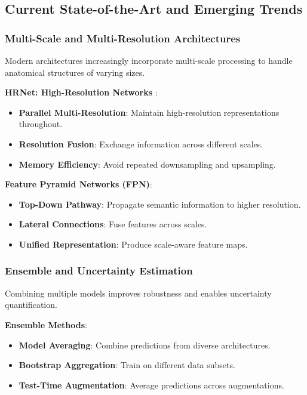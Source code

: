 \documentclass[12pt,a4paper]{article}
\begin{document}
\subsection{Current State-of-the-Art and Emerging Trends}

\subsubsection{Multi-Scale and Multi-Resolution Architectures}

Modern architectures increasingly incorporate multi-scale processing to handle anatomical structures of varying sizes.

\textbf{HRNet: High-Resolution Networks} \cite{wang2020deep}:
\begin{itemize}
    \item \textbf{Parallel Multi-Resolution}: Maintain high-resolution representations throughout.
    \item \textbf{Resolution Fusion}: Exchange information across different scales.
    \item \textbf{Memory Efficiency}: Avoid repeated downsampling and upsampling.
\end{itemize}

\textbf{Feature Pyramid Networks (FPN)}:
\begin{itemize}
    \item \textbf{Top-Down Pathway}: Propagate semantic information to higher resolution.
    \item \textbf{Lateral Connections}: Fuse features across scales.
    \item \textbf{Unified Representation}: Produce scale-aware feature maps.
\end{itemize}

\subsubsection{Ensemble and Uncertainty Estimation}

Combining multiple models improves robustness and enables uncertainty quantification.

\textbf{Ensemble Methods}:
\begin{itemize}
    \item \textbf{Model Averaging}: Combine predictions from diverse architectures.
    \item \textbf{Bootstrap Aggregation}: Train on different data subsets.
    \item \textbf{Test-Time Augmentation}: Average predictions across augmentations.
\end{itemize}
\end{document}
